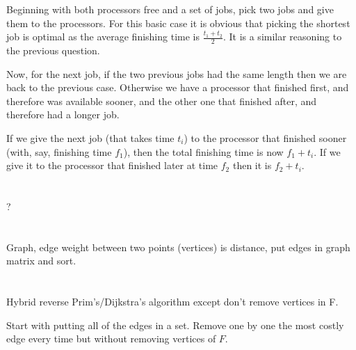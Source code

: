 \documentclass[11pt,letterpaper]{article}
\begin{document}
		Beginning with both processors free and a set of jobs, pick two jobs and give them to the processors. For this basic case it is obvious that picking the shortest job is optimal as the average finishing time is $\frac{t_1 + t_2}{2}$. It is a similar reasoning to the previous question.
		
		Now, for the next job, if the two previous jobs had the same length then we are back to the previous case.
		Otherwise we have a processor that finished first, and therefore was available sooner, and the other one that finished after, and therefore had a longer job.
		
		If we give the next job (that takes time $t_i$) to the processor that finished sooner (with, say, finishing time $f_1$), then the total finishing time is now $f_1 + t_i$.
		If we give it to the processor that finished later at time $f_2$ then it is $f_2 + t_i$.
		
	\section{}
		?
		
	\section{}
		Graph, edge weight between two points (vertices) is distance, put edges in graph matrix and sort.
		
	\section{}
		Hybrid reverse Prim's/Dijkstra's algorithm except don't remove vertices in F.
		
		Start with putting all of the edges in a set. Remove one by one the most costly edge every time but without removing vertices of $F$.
	
\end{document}
